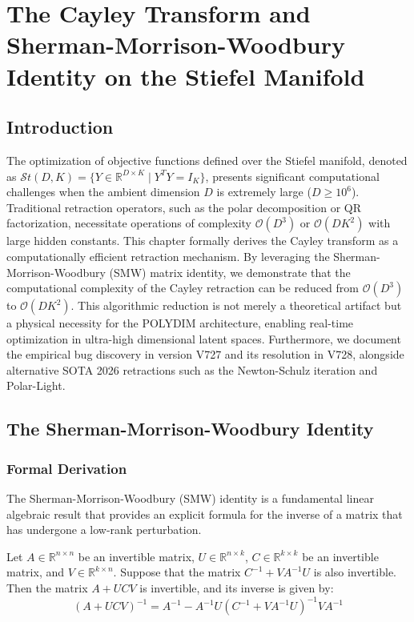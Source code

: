 \chapter{The Cayley Transform and Sherman-Morrison-Woodbury Identity on the Stiefel Manifold}


\section{Introduction}

The optimization of objective functions defined over the Stiefel manifold, denoted as $\mathcal{S}t(D, K) = \{ Y \in \mathbb{R}^{D \times K} \mid Y^T Y = I_K \}$, presents significant computational challenges when the ambient dimension $D$ is extremely large ($D \ge 10^6$). Traditional retraction operators, such as the polar decomposition or QR factorization, necessitate operations of complexity $\mathcal{O}(D^3)$ or $\mathcal{O}(DK^2)$ with large hidden constants. This chapter formally derives the Cayley transform as a computationally efficient retraction mechanism. By leveraging the Sherman-Morrison-Woodbury (SMW) matrix identity, we demonstrate that the computational complexity of the Cayley retraction can be reduced from $\mathcal{O}(D^3)$ to $\mathcal{O}(DK^2)$. This algorithmic reduction is not merely a theoretical artifact but a physical necessity for the POLYDIM architecture, enabling real-time optimization in ultra-high dimensional latent spaces. Furthermore, we document the empirical bug discovery in version V727 and its resolution in V728, alongside alternative SOTA 2026 retractions such as the Newton-Schulz iteration and Polar-Light.

\section{The Sherman-Morrison-Woodbury Identity}

\subsection{Formal Derivation}

The Sherman-Morrison-Woodbury (SMW) identity is a fundamental linear algebraic result that provides an explicit formula for the inverse of a matrix that has undergone a low-rank perturbation.

\begin{theorem}
Let $A \in \mathbb{R}^{n \times n}$ be an invertible matrix, $U \in \mathbb{R}^{n \times k}$, $C \in \mathbb{R}^{k \times k}$ be an invertible matrix, and $V \in \mathbb{R}^{k \times n}$. Suppose that the matrix $C^{-1} + V A^{-1} U$ is also invertible. Then the matrix $A + UCV$ is invertible, and its inverse is given by:
\begin{equation}
(A + UCV)^{-1} = A^{-1} - A^{-1}U(C^{-1} + VA^{-1}U)^{-1}VA^{-1} 
\end{equation}
\end{theorem}

